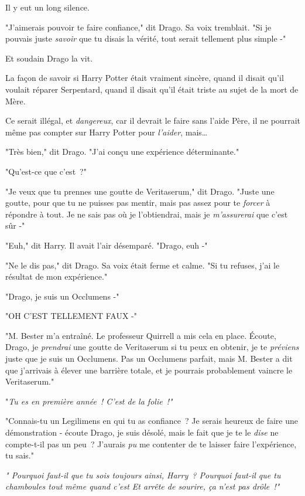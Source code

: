 Il y eut un long silence.

"J'aimerais pouvoir te faire confiance," dit Drago. Sa voix tremblait. "Si je pouvais juste \emph{savoir} que tu disais la vérité, tout serait tellement plus simple -"

Et soudain Drago la vit.

La façon de savoir si Harry Potter était vraiment sincère, quand il disait qu'il voulait réparer Serpentard, quand il disait qu'il était triste au sujet de la mort de Mère.

Ce serait illégal, et \emph{dangereux}, car il devrait le faire sans l'aide Père, il ne pourrait même pas compter sur Harry Potter pour \emph{l'aider}, mais…

"Très bien," dit Drago. "J'ai conçu une expérience déterminante."

"Qu'est-ce que c'est~?"

"Je veux que tu prennes une goutte de Veritaserum," dit Drago. "Juste une goutte, pour que tu ne puisses pas mentir, mais pas assez pour te \emph{forcer} à répondre à tout. Je ne sais pas où je l'obtiendrai, mais je \emph{m'assurerai} que c'est sûr -"

"Euh," dit Harry. Il avait l'air désemparé. "Drago, euh -"

"Ne le dis pas," dit Drago. Sa voix était ferme et calme. "Si tu refuses, j'ai le résultat de mon expérience."

"Drago, je suis un Occlumens -"

"OH C'EST TELLEMENT FAUX -"

"M. Bester m'a entraîné. Le professeur Quirrell a mis cela en place. Écoute, Drago, je \emph{prendrai} une goutte de Veritaserum si tu peux en obtenir, je te \emph{préviens} juste que je suis un Occlumens. Pas un Occlumens parfait, mais M. Bester a dit que j'arrivais à élever une barrière totale, et je pourrais probablement vaincre le Veritaserum."

"\emph{Tu es en première année~! C'est de la folie~!"}

"Connais-tu un Legilimens en qui tu as confiance~? Je serais heureux de faire une démonstration - écoute Drago, je suis désolé, mais le fait que je te le \emph{dise} ne compte-t-il pas un peu~? J'aurais \emph{pu} me contenter de te laisser faire l'expérience, tu sais."

\emph{" Pourquoi faut-il que tu sois toujours ainsi, Harry~? Pourquoi faut-il que tu chamboules tout même quand c'est  Et arrête de sourire, ça n'est pas drôle~!"}

